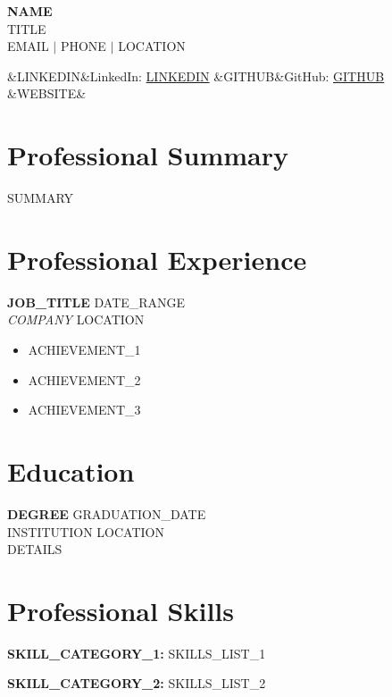 \documentclass[11pt,a4paper]{article}
\newcommand{\cvheader}[5]{
    \begin{center}
        {\LARGE\bfseries #1} \\[6pt]
        {\normalsize #2} \\[8pt]
        #3 $\vert$ #4 $\vert$ #5
    \end{center}
    \vspace{8pt}
}
\newcommand{\cvlinks}[3]{
    \begin{center}
        \ifx&#1&\else LinkedIn: \href{#1}{#1} \quad\fi
        \ifx&#2&\else GitHub: \href{#2}{#2} \quad\fi
        \ifx&#3&\else #3\fi
    \end{center}
    \vspace{5pt}
}
\newcommand{\cventry}[5]{
    \noindent
    \textbf{#1} \hfill #2 \\
    \textit{#3} \hfill #4 \\[4pt]
    #5
    \vspace{10pt}
}
\newcommand{\cveducation}[5]{
    \noindent
    \textbf{#1} \hfill #2 \\
    #3 \hfill #4 \\[4pt]
    #5
    \vspace{10pt}
}
\begin{document}
\cvheader
    {{NAME}}
    {{TITLE}}
    {{EMAIL}}
    {{PHONE}}
    {{LOCATION}}

\cvlinks
    {{LINKEDIN}}
    {{GITHUB}}
    {{WEBSITE}}

\section*{Professional Summary}
{{SUMMARY}}

\section*{Professional Experience}

\cventry
    {{JOB_TITLE}}
    {{DATE_RANGE}}
    {{COMPANY}}
    {{LOCATION}}
    {
    \begin{itemize}[leftmargin=*, itemsep=2pt, parsep=0pt]
        \item {{ACHIEVEMENT_1}}
        \item {{ACHIEVEMENT_2}}
        \item {{ACHIEVEMENT_3}}
    \end{itemize}
    }


\section*{Education}

\cveducation
    {{DEGREE}}
    {{GRADUATION_DATE}}
    {{INSTITUTION}}
    {{LOCATION}}
    {{{DETAILS}}}

\section*{Professional Skills}

\noindent
\textbf{{{SKILL_CATEGORY_1}}:} {{SKILLS_LIST_1}}

\noindent
\textbf{{{SKILL_CATEGORY_2}}:} {{SKILLS_LIST_2}}

\end{document}
